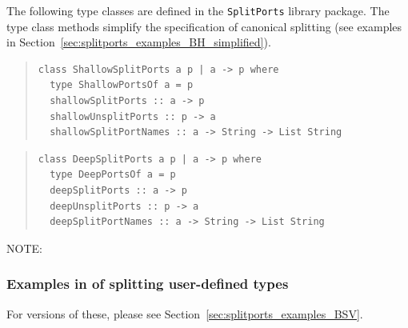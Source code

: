 


The following type classes are defined in the {\tt SplitPorts} library
package. The type class methods simplify the specification of
canonical splitting (see examples in
Section~\ref{sec:splitports_examples_BH_simplified}).

\begin{quote}
\begin{verbatim}
class ShallowSplitPorts a p | a -> p where
  type ShallowPortsOf a = p
  shallowSplitPorts :: a -> p
  shallowUnsplitPorts :: p -> a
  shallowSplitPortNames :: a -> String -> List String
\end{verbatim}
\end{quote}

\begin{quote}
\begin{verbatim}
class DeepSplitPorts a p | a -> p where
  type DeepPortsOf a = p
  deepSplitPorts :: a -> p
  deepUnsplitPorts :: p -> a
  deepSplitPortNames :: a -> String -> List String
\end{verbatim}
\end{quote}

NOTE: \hfill {}


\subsubsection{Examples in {\BHb} of splitting user-defined types}

\label{sec:splitports_examples_BH}

{\footnotesize
For {\BSVb} versions of these, please see Section~\ref{sec:splitports_examples_BSV}.}

